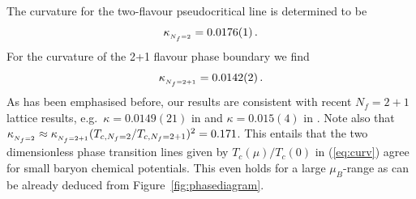 \documentclass[%
reprint,
superscriptaddress,
showpacs,preprintnumbers,
 amsmath,amssymb,
 aps,
prd,
]{revtex4-1}
\def\Fig#1{Figure~\ref{#1}}
\def\eq#1{(\ref{#1})}
\begin{document}
The curvature for the two-flavour pseudocritical line is determined to
be
%
\begin{align}
  \kappa_{_{\tiny{N_f=2}}}=0.0176(1)\,.
\end{align}
%
For the curvature of the 2+1 flavour phase boundary we find
%
\begin{align}
  \kappa_{_{\tiny{N_f=2+1}}}=0.0142(2)\,.
\end{align}
%
As has been emphasised before, our results are consistent with recent
$N_f = 2+1$ lattice results, e.g.\ $\kappa=0.0149(21)$ in
\cite{Bellwied:2015rza} and $\kappa=0.015(4)$ in
\cite{Bazavov:2018mes}. Note also that
$\kappa_{_{\tiny{N_f=2}}} \approx \kappa_{_{\tiny{N_f=2+1}}}
(T_{c,{\tiny{N_f=2}}}/T_{c,{\tiny{N_f=2+1}}})^2=0.171$. This entails
that the two dimensionless phase transition lines given by
$T_c(\mu)/T_c(0)$ in \eq{eq:curv} agree for small baryon chemical
potentials. This even holds for a large $\mu_B$-range as can be
already deduced from \Fig{fig:phasediagram}.
\end{document}
